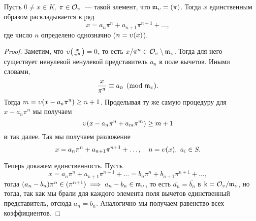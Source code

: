 	\begin{theorem}\label{ant_2_thm_2}
		Пусть $0 \neq x \in K$, $\pi \in \mathcal{O}_{\upsilon}$~--- такой элемент, что $\mathfrak{m}_{\upsilon} = (\pi)$. Тогда $x$ единственным образом раскладывается в ряд 
		\[
			x = a_n \pi^n + a_{n + 1} \pi^{n + 1} + \ldots,
		\]
		где число $n$ определено однозначно ($n = \upsilon(x)$). 
	\end{theorem}
	\begin{proof}
		Заметим, что $\v\lr*{\frac{x}{\pi^n}} = 0$, то есть $x/\pi^n \in \mathcal{O}_{\upsilon} \setminus \mathfrak{m}_{\upsilon}$. Тогда для него существует ненулевой  ненулевой представитель $a_n$ в поле вычетов. Иными словами, 
		\[
			\frac{x}{\pi^n} \equiv a_n \pmod{\mathfrak{m}_{\upsilon}}. 
		\]
		Тогда $m = \upsilon(x - a_n\pi^n) \ge n + 1$. Проделывая ту же самую процедуру для $x - a_n\pi^n$ мы получаем
		\[
		 	\upsilon(x - a_n \pi^n + a_m \pi^m) \ge m + 1
		 \] 
		 и так далее. Так мы получаем разложение 
		 \[
		 	x = a_n \pi^n + a_{n + 1}\pi^{n + 1} + \ldots, \quad n = \upsilon(x), \ a_i \in S.
		 \]

		 Теперь докажем единственность. Пусть 
		 \[
		 	x = a_n \pi^n + a_{n + 1}\pi^{n + 1} + \ldots = b_n \pi^n + b_{n + 1}\pi^{n + 1} + \ldots,
		 \]
		 тогда $(a_n - b_n)\pi^{n} \in  (\pi^{n + 1}) \implies a_n - b_n \in \mathfrak{m}_{\upsilon}$, то есть 
		 $\overline{a_n} = \overline{b_n}$ в $\Bbbk = \mathcal{O}_{\upsilon}/\mathfrak{m}_{\upsilon}$, но тогда, так как мы брали для каждого элемента поля вычетов единственный представитель, отсюда $a_n = b_n$. Аналогично мы получаем равенство всех коэффициентов. 
	\end{proof}

